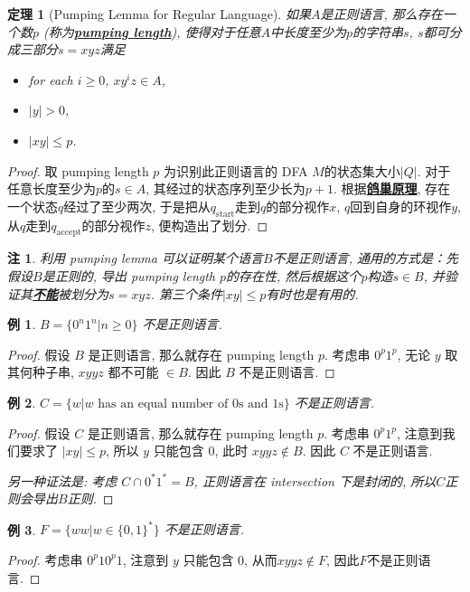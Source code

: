 \documentclass[8pt]{article}
\theoremstyle{compact}
\newtheorem{theorem}{定理}
\newtheorem{example}{例}
\newtheorem{remark}{注}
\def\obj#1{\textbf{\uline{#1}}}
\def\le{\leqslant}
\def\ge{\geqslant}
\begin{document}
\begin{theorem}[Pumping Lemma for Regular Language]
	如果$A$是正则语言, 那么存在一个数$p$ (称为\obj{pumping length}), 使得对于任意$A$中长度至少为$p$的字符串$s$, $s$都可分成三部分$s = xyz$满足
	\begin{itemize}
		\item for each $i \ge 0$, $xy^iz \in A$,
		\item $|y| > 0$,
		\item $|xy| \le p$.
	\end{itemize}
\end{theorem}
\begin{proof}
	取 pumping length $p$ 为识别此正则语言的 DFA $M$的状态集大小$|Q|$. 对于任意长度至少为$p$的$s \in A$, 其经过的状态序列至少长为$p+1$. 根据\obj{鸽巢原理}, 存在一个状态$q$经过了至少两次, 于是把从$q_{\text{start}}$走到$q$的部分视作$x$, $q$回到自身的环视作$y$, 从$q$走到$q_{\text{accept}}$的部分视作$z$, 便构造出了划分. 
\end{proof}
\begin{remark}
	利用 pumping lemma 可以证明某个语言$B$不是正则语言, 通用的方式是：先假设$B$是正则的, 导出 pumping length $p$的存在性, 然后根据这个$p$构造$s \in B$, 并验证其\obj{不能}被划分为$s = xyz$. 第三个条件$|xy| \le p$有时也是有用的. 
\end{remark}
\begin{example}
	$B = \{0^n1^n | n \ge 0\}$ 不是正则语言.
\end{example}
\begin{proof}
	假设 $B$ 是正则语言, 那么就存在 pumping length $p$. 考虑串 $0^p1^p$, 无论 $y$ 取其何种子串, $xyyz$ 都不可能 $\in B$. 因此 $B$ 不是正则语言.
\end{proof}
\begin{example}
	$C = \{w | w \text{ has an equal number of 0s and 1s}\}$ 不是正则语言.
\end{example}
\begin{proof}
	假设 $C$ 是正则语言, 那么就存在 pumping length $p$. 考虑串 $0^p1^p$, 注意到我们要求了 $|xy| \le p$, 所以 $y$ 只能包含 $0$, 此时 $xyyz \notin B$. 因此 $C$ 不是正则语言.
	
	\textit{另一种证法是: 考虑 $C \cap 0^*1^* = B$, 正则语言在 intersection 下是封闭的, 所以$C$正则会导出$B$正则.}
\end{proof}
\begin{example}
	$F = \{ww | w \in \{0, 1\}^*\}$ 不是正则语言.
\end{example}
\begin{proof}
	考虑串 $0^p10^p1$, 注意到 $y$ 只能包含 $0$, 从而$xyyz \notin F$, 因此$F$不是正则语言.
\end{proof}
\end{document}
